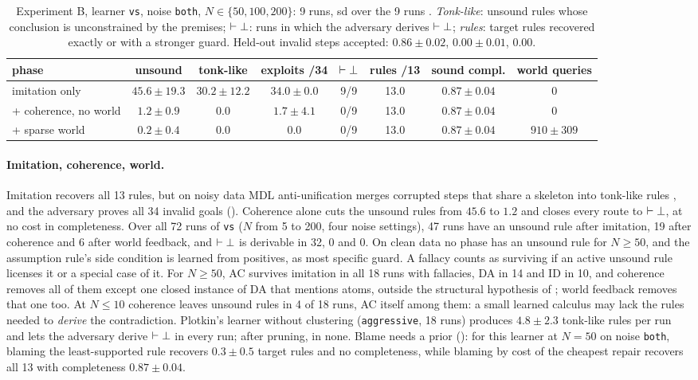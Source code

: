 \begin{table}[ht]
\centering\footnotesize
\setlength{\tabcolsep}{3.5pt}
\begin{tabular}{@{}lccccccc@{}}
\toprule
phase & unsound & tonk-like & exploits /34 & $\vdash\bot$ & rules /13 & sound compl. & world queries\\
\midrule
imitation only & $45.6\pm19.3$ & $30.2\pm12.2$ & $34.0\pm0.0$ & 9/9 & 13.0 & $0.87\pm0.04$ & 0\\
+ coherence, no world & $1.2\pm0.9$ & $0.0$ & $1.7\pm4.1$ & 0/9 & 13.0 & $0.87\pm0.04$ & 0\\
+ sparse world & $0.2\pm0.4$ & $0.0$ & $0.0$ & 0/9 & 13.0 & $0.87\pm0.04$ & $910\pm309$\\
\bottomrule
\end{tabular}
\caption{Experiment B, learner \texttt{vs}, noise \texttt{both}, $N\in\{50,100,200\}$: 9 runs, sd over the 9 runs . \emph{Tonk-like}: unsound rules whose conclusion is unconstrained by the premises; $\vdash\bot$: runs in which the adversary derives $\vdash\bot$; \emph{rules}: target rules recovered exactly or with a stronger guard. Held-out invalid steps accepted: $0.86\pm0.02$, $0.00\pm0.01$, $0.00$.}
\label{tab:experiments:prop}
\end{table}

\paragraph{Imitation, coherence, world.} Imitation recovers all 13 rules, but on noisy data MDL anti-unification merges corrupted steps that share a skeleton into tonk-like rules \citep{prior1960runabout}, and the adversary proves all 34 invalid goals (). Coherence alone cuts the unsound rules from $45.6$ to $1.2$ and closes every route to $\vdash\bot$, at no cost in completeness. Over all 72 runs of \texttt{vs} ($N$ from 5 to 200, four noise settings), 47 runs have an unsound rule after imitation, 19 after coherence and 6 after world feedback, and $\vdash\bot$ is derivable in 32, 0 and 0. On clean data no phase has an unsound rule for $N\ge50$, and the assumption rule's side condition is learned from positives, as most specific guard. A fallacy counts as surviving if an active unsound rule licenses it or a special case of it. For $N\ge50$, AC survives imitation in all 18 runs with fallacies, DA in 14 and ID in 10, and coherence removes all of them except one closed instance of DA that mentions atoms, outside the structural hypothesis of ; world feedback removes that one too. At $N\le10$ coherence leaves unsound rules in 4 of 18 runs, AC itself among them: a small learned calculus may lack the rules needed to \emph{derive} the contradiction. Plotkin's learner without clustering (\texttt{aggressive}, 18 runs) produces $4.8\pm2.3$ tonk-like rules per run and lets the adversary derive $\vdash\bot$ in every run; after pruning, in none. Blame needs a prior (): for this learner at $N=50$ on noise \texttt{both}, blaming the least-supported rule recovers $0.3\pm0.5$ target rules and no completeness, while blaming by cost of the cheapest repair recovers all 13 with completeness $0.87\pm0.04$.

